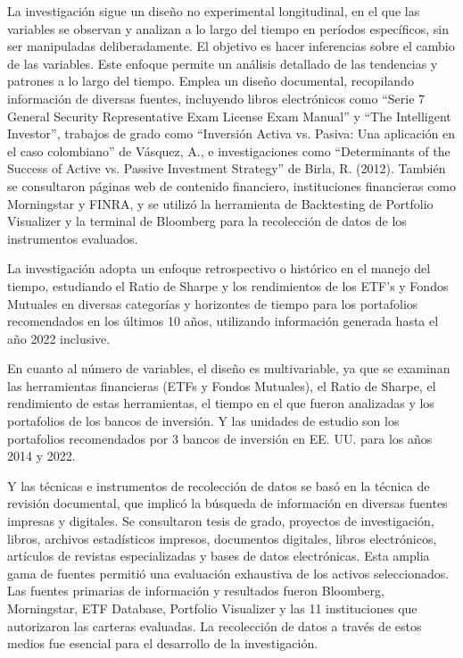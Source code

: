 \documentclass[a4paper,fleqn]{cas-sc}
\begin{document}
La investigación sigue un diseño no experimental longitudinal, en el que las variables se observan y analizan a lo largo del tiempo en períodos específicos, sin ser manipuladas deliberadamente. El objetivo es hacer inferencias sobre el cambio de las variables. Este enfoque permite un análisis detallado de las tendencias y patrones a lo largo del tiempo.  Emplea un diseño documental, recopilando información de diversas fuentes, incluyendo libros electrónicos como “Serie 7 General Security Representative Exam License Exam Manual” y “The Intelligent Investor”, trabajos de grado como “Inversión Activa vs. Pasiva: Una aplicación en el caso colombiano” de Vásquez, A., e investigaciones como “Determinants of the Success of Active vs. Passive Investment Strategy” de Birla, R. (2012). También se consultaron páginas web de contenido financiero, instituciones financieras como Morningstar y FINRA, y se utilizó la herramienta de Backtesting de Portfolio Visualizer y la terminal de Bloomberg para la recolección de datos de los instrumentos evaluados.

La investigación adopta un enfoque retrospectivo o histórico en el manejo del tiempo, estudiando el Ratio de Sharpe y los rendimientos de los ETF’s y Fondos Mutuales en diversas categorías y horizontes de tiempo para los portafolios recomendados en los últimos 10 años, utilizando información generada hasta el año 2022 inclusive.

En cuanto al número de variables, el diseño es multivariable, ya que se examinan las herramientas financieras (ETFs y Fondos Mutuales), el Ratio de Sharpe, el rendimiento de estas herramientas, el tiempo en el que fueron analizadas y los portafolios de los bancos de inversión. Y las unidades de estudio son los portafolios recomendados por 3 bancos de inversión en EE. UU. para los años 2014 y 2022.

Y las técnicas e instrumentos de recolección de datos  se basó en la técnica de revisión documental, que implicó la búsqueda de información en diversas fuentes impresas y digitales. Se consultaron tesis de grado, proyectos de investigación, libros, archivos estadísticos impresos, documentos digitales, libros electrónicos, artículos de revistas especializadas y bases de datos electrónicas. Esta amplia gama de fuentes permitió una evaluación exhaustiva de los activos seleccionados. Las fuentes primarias de información y resultados fueron Bloomberg, Morningstar, ETF Database, Portfolio Visualizer y las 11 instituciones que autorizaron las carteras evaluadas. La recolección de datos a través de estos medios fue esencial para el desarrollo de la investigación.
\end{document}
